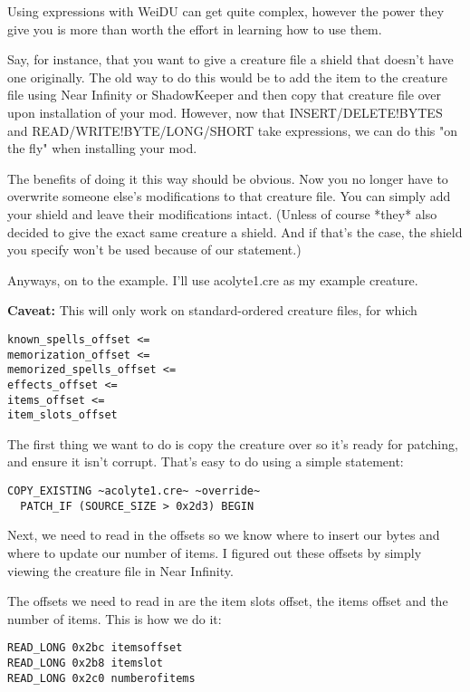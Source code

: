 \documentclass{article}
\def\ttref#1{\ahrefloc{#1}{\tt #1}}
\begin{document}
Using expressions with WeiDU can get quite complex, however the power they
give you is more than worth the effort in learning how to use them.

Say, for instance, that you want to give a creature file a shield that
doesn't have one originally.  The old way to do this would be to add the
item to the creature file using Near Infinity or ShadowKeeper and then copy
that creature file over upon installation of your mod.  However, now that
INSERT/DELETE!BYTES and READ/WRITE!BYTE/LONG/SHORT take expressions, we can
do this "on the fly" when installing your mod.

The benefits of doing it this way should be obvious.  Now you no longer
have to overwrite someone else's modifications to that creature file.  You
can simply add your shield and leave their modifications intact.  (Unless
of course *they* also decided to give the exact same creature a shield.
And if that's the case, the shield you specify won't be used because of our
\ttref{PATCH!IF} statement.)

Anyways, on to the example.  I'll use acolyte1.cre as my example creature.

\textbf{Caveat:} This will only work on standard-ordered creature files, for
which
\begin{verbatim}
known_spells_offset <=
memorization_offset <=
memorized_spells_offset <=
effects_offset <=
items_offset <=
item_slots_offset
\end{verbatim}

The first thing we want to do is copy the creature over so it's ready for
patching, and ensure it isn't corrupt.  That's easy to do using a simple
\ttref{COPY!EXISTING} statement:

\begin{verbatim}
COPY_EXISTING ~acolyte1.cre~ ~override~
  PATCH_IF (SOURCE_SIZE > 0x2d3) BEGIN
\end{verbatim}

Next, we need to read in the offsets so we know where to insert our bytes and
where to update our number of items.  I figured out these offsets by simply
viewing the creature file in Near Infinity.

The offsets we need to read in are the item slots offset, the items offset and
the number of items.  This is how we do it:

\begin{verbatim}
READ_LONG 0x2bc itemsoffset
READ_LONG 0x2b8 itemslot
READ_LONG 0x2c0 numberofitems
\end{verbatim}
\end{document}
